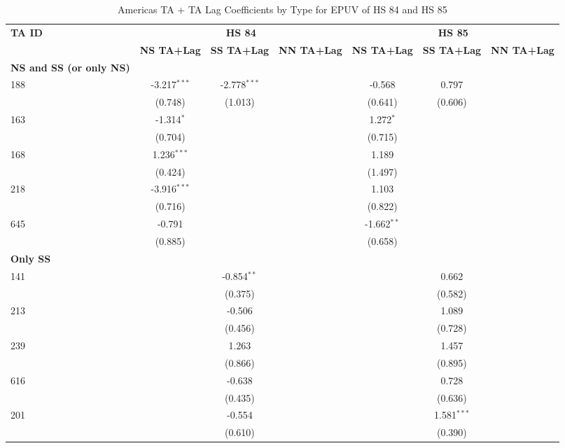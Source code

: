 \begin{table}[htbp]
    \centering
    \caption{Americas TA + TA Lag Coefficients by Type for EPUV of HS 84 and HS 85}
    \label{tab:epuv_americas_pta}
    \begin{adjustbox}{max width=\textwidth}
    \begin{tabular}{lcccccc}
    \hline
    \textbf{TA ID} & \multicolumn{3}{c}{\textbf{HS 84}} & \multicolumn{3}{c}{\textbf{HS 85}} \\
    & \textbf{NS TA+Lag} & \textbf{SS TA+Lag} & \textbf{NN TA+Lag} & \textbf{NS TA+Lag} & \textbf{SS TA+Lag} & \textbf{NN TA+Lag} \\
    \hline
    \textbf{NS and SS (or only NS)} &  &  &  &  &  &  \\
    \hline
    188 & -3.217$^{\ast\ast\ast}$ & -2.778$^{\ast\ast\ast}$ &  & -0.568 & 0.797 &  \\
    & (0.748) & (1.013) &  & (0.641) & (0.606) &  \\
    163 & -1.314$^{\ast}$ &  &  & 1.272$^{\ast}$ &  &  \\
     & (0.704) &  &  & (0.715) &  &  \\
    168 & 1.236$^{\ast\ast\ast}$ &  &  & 1.189 &  &  \\
     & (0.424) &  &  & (1.497) &  &  \\
    218 & -3.916$^{\ast\ast\ast}$ &  &  & 1.103 &  &  \\
     & (0.716) &  &  & (0.822) &  &  \\
    645 & -0.791 &  &  & -1.662$^{\ast\ast}$ &  &  \\
     & (0.885) &  &  & (0.658) &  &  \\
    \hline
    \textbf{Only SS} &  &  &  &  &  &  \\
    \hline
    141 &  & -0.854$^{\ast\ast}$ &  &  & 0.662 &  \\
     &  & (0.375) &  &  & (0.582) &  \\
    213 &  & -0.506 &  &  & 1.089 &  \\
     &  & (0.456) &  &  & (0.728) &  \\
    239 &  & 1.263 &  &  & 1.457 &  \\
     &  & (0.866) &  &  & (0.895) &  \\
    616 &  & -0.638 &  &  & 0.728 &  \\
     &  & (0.435) &  &  & (0.636) &  \\
    201 &  & -0.554 &  &  & 1.581$^{\ast\ast\ast}$ &  \\
     &  & (0.610) &  &  & (0.390) &  \\

\end{tabular}
\end{adjustbox}
\end{table}
